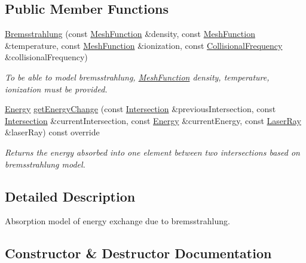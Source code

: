 \subsection*{Public Member Functions}
\begin{DoxyCompactItemize}
\item 
\hyperlink{structraytracer_1_1Bremsstrahlung_aa987a459be2174c29a33a2f8a5845c95}{Bremsstrahlung} (const \hyperlink{classraytracer_1_1MeshFunction}{Mesh\+Function} \&density, const \hyperlink{classraytracer_1_1MeshFunction}{Mesh\+Function} \&temperature, const \hyperlink{classraytracer_1_1MeshFunction}{Mesh\+Function} \&ionization, const \hyperlink{classraytracer_1_1CollisionalFrequency}{Collisional\+Frequency} \&collisional\+Frequency)
\begin{DoxyCompactList}\small\item\em To be able to model bremsstrahlung, \hyperlink{classraytracer_1_1MeshFunction}{Mesh\+Function} density, temperature, ionization must be provided. \end{DoxyCompactList}\item 
\hyperlink{structraytracer_1_1Energy}{Energy} \hyperlink{structraytracer_1_1Bremsstrahlung_a510d57af7c09bb24d786afab8086b748}{get\+Energy\+Change} (const \hyperlink{structraytracer_1_1Intersection}{Intersection} \&previous\+Intersection, const \hyperlink{structraytracer_1_1Intersection}{Intersection} \&current\+Intersection, const \hyperlink{structraytracer_1_1Energy}{Energy} \&current\+Energy, const \hyperlink{classraytracer_1_1LaserRay}{Laser\+Ray} \&laser\+Ray) const override
\begin{DoxyCompactList}\small\item\em Returns the energy absorbed into one element between two intersections based on bremsstrahlung model. \end{DoxyCompactList}\end{DoxyCompactItemize}


\subsection{Detailed Description}
Absorption model of energy exchange due to bremsstrahlung. 

\subsection{Constructor \& Destructor Documentation}
\mbox{\label{structraytracer_1_1Bremsstrahlung_aa987a459be2174c29a33a2f8a5845c95}} 
